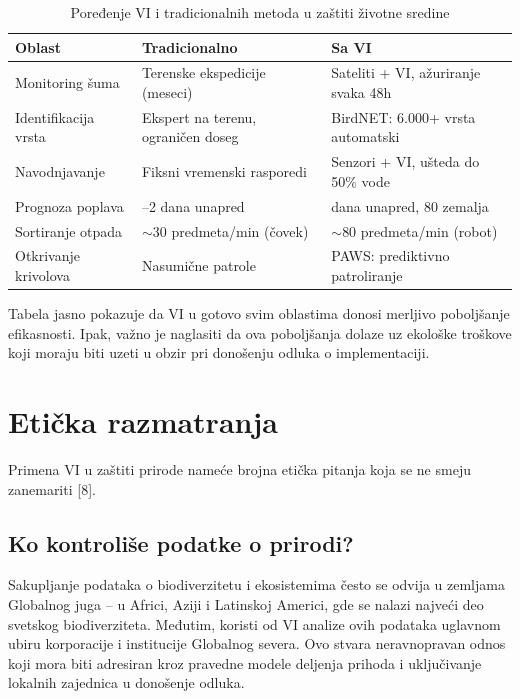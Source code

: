 \documentclass[12pt,a4paper]{article}
\begin{document}
\begin{table}[htbp]
\centering
\small
\caption{Poređenje VI i tradicionalnih metoda u zaštiti životne sredine}
\begin{tabular}{>{\raggedright\arraybackslash}p{} >{\raggedright\arraybackslash}p{} >{\raggedright\arraybackslash}p{}}
\toprule
\textbf{Oblast} & \textbf{Tradicionalno} & \textbf{Sa VI} \\
\midrule
Monitoring šuma & Terenske ekspedicije (meseci) & Sateliti + VI, ažuriranje svaka 48h \\
Identifikacija vrsta & Ekspert na terenu, ograničen doseg & BirdNET: 6.000+ vrsta automatski \\
Navodnjavanje & Fiksni vremenski rasporedi & Senzori + VI, ušteda do 50\% vode \\
Prognoza poplava & 1--2 dana unapred & 7 dana unapred, 80 zemalja \\
Sortiranje otpada & $\sim$30 predmeta/min (čovek) & $\sim$80 predmeta/min (robot) \\
Otkrivanje krivolova & Nasumične patrole & PAWS: prediktivno patroliranje \\
\bottomrule
\end{tabular}
\end{table}

Tabela jasno pokazuje da VI u gotovo svim oblastima donosi merljivo poboljšanje efikasnosti. Ipak, važno je naglasiti da ova poboljšanja dolaze uz ekološke troškove koji moraju biti uzeti u obzir pri donošenju odluka o implementaciji.

\section{Etička razmatranja}
Primena VI u zaštiti prirode nameće brojna etička pitanja koja se ne smeju zanemariti [8].

\subsection{Ko kontroliše podatke o prirodi?}
Sakupljanje podataka o biodiverzitetu i ekosistemima često se odvija u zemljama Globalnog juga -- u Africi, Aziji i Latinskoj Americi, gde se nalazi najveći deo svetskog biodiverziteta. Međutim, koristi od VI analize ovih podataka uglavnom ubiru korporacije i institucije Globalnog severa. Ovo stvara neravnopravan odnos koji mora biti adresiran kroz pravedne modele deljenja prihoda i uključivanje lokalnih zajednica u donošenje odluka.
\end{document}
